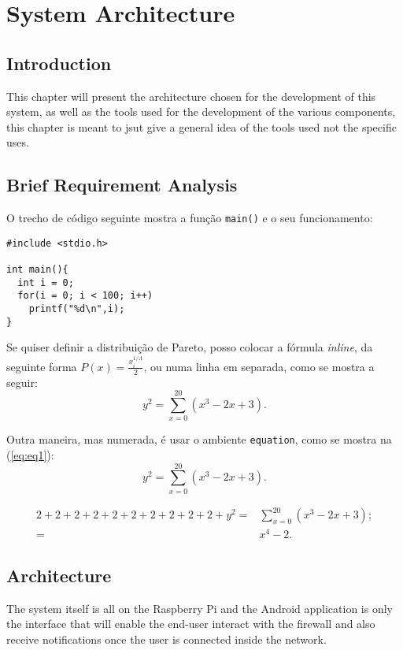\chapter{System Architecture}
\label{chap:sys-arch}

\section{Introduction}
\label{chap3:sec:intro}
This chapter will present the architecture chosen for the development of this
system, as well as the tools used for the development of the various components,
this chapter is meant to jsut give a general idea of the tools used not the
specific uses.

\section{Brief Requirement Analysis}
\label{chap3:sec:reqs}

O trecho de código seguinte mostra a função \texttt{main()} e o seu funcionamento:
\begin{lstlisting}[caption=Trecho de código usado no projeto.]
#include <stdio.h>

int main(){
  int i = 0;
  for(i = 0; i < 100; i++)
    printf("%d\n",i);
}
\end{lstlisting}


Se quiser definir a distribuição de Pareto, posso colocar a fórmula \emph{inline}, da seguinte forma $P(x)=\frac{x^{1/\Lambda}_{i}}{2}$, ou numa linha em separada, como se mostra a seguir:
$$ y^2 = \sum_{x=0}^{20}( x^3 - 2x + 3).$$

Outra maneira, mas numerada, é usar o ambiente \texttt{equation}, como se mostra na (\ref{eq:eq1}):
\begin{equation}
 y^2 = \sum_{x=0}^{20}( x^3 - 2x + 3).
 \label{eq:eq1}
\end{equation}

\begin{align}
 2+2+2+2+2+2+2+2+2+2+y^2 = & \sum_{x=0}^{20}( x^3 - 2x + 3);\\
                         = & x^4 -2.
 \label{eq:eq2}
\end{align}

\section{Architecture}
\label{chap3:sec:arch}
The system itself is all on the Raspberry Pi and the Android application is only
the interface that will enable the end-user interact with the firewall and also
receive notifications once the user is connected inside the network.

